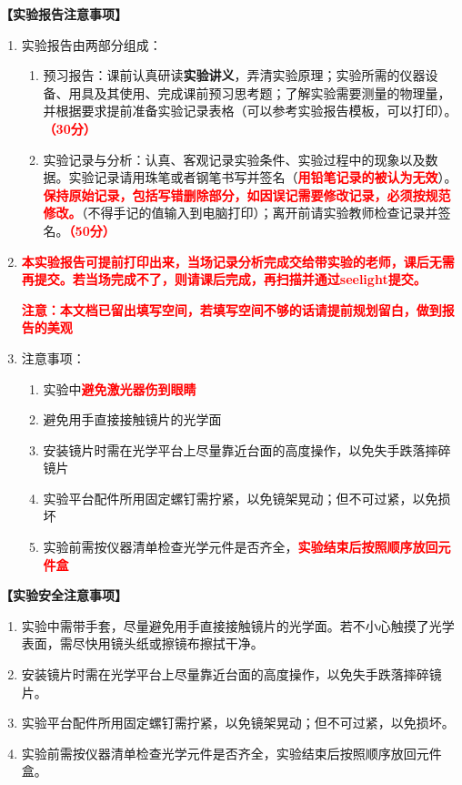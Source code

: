 \documentclass[dvipsnames, svgnames,a4paper,11pt]{article}
\begin{document}
	\textbf{【实验报告注意事项】}
	\begin{enumerate}[label=\arabic*., leftmargin=*]
		\item 实验报告由两部分组成：
		\begin{enumerate}[label=\arabic*), leftmargin=*]
			\item 预习报告：课前认真研读\textbf{实验讲义}，弄清实验原理；实验所需的仪器设备、用具及其使用、完成课前预习思考题；了解实验需要测量的物理量，并根据要求提前准备实验记录表格（可以参考实验报告模板，可以打印）。\textcolor{red}{\textbf{（30分）}}
			\item 实验记录与分析：认真、客观记录实验条件、实验过程中的现象以及数据。实验记录请用珠笔或者钢笔书写并签名（\textcolor{red}{\textbf{用铅笔记录的被认为无效}}）。\textcolor{red}{\textbf{保持原始记录，包括写错删除部分，如因误记需要修改记录，必须按规范修改。}}（不得手记的值输入到电脑打印）；离开前请实验教师检查记录并签名。\textcolor{red}{\textbf{（50分）}}
		\end{enumerate}
		
		\item \textcolor{red}{\textbf{本实验报告可提前打印出来，当场记录分析完成交给带实验的老师，课后无需再提交。若当场完成不了，则请课后完成，再扫描并通过seelight提交。}}
		
		\textcolor{red}{\textbf{注意：本文档已留出填写空间，若填写空间不够的话请提前规划留白，做到报告的美观}}
		\item 注意事项：
		\begin{enumerate}[label=\arabic*), leftmargin=*]
			\item 实验中\textcolor{red}{\textbf{避免激光器伤到眼睛}}
			\item 避免用手直接接触镜片的光学面
			\item 安装镜片时需在光学平台上尽量靠近台面的高度操作，以免失手跌落摔碎镜片
			\item 实验平台配件所用固定螺钉需拧紧，以免镜架晃动；但不可过紧，以免损坏
			\item 实验前需按仪器清单检查光学元件是否齐全，\textcolor{red}{\textbf{实验结束后按照顺序放回元件盒}}
			
		\end{enumerate}
	\end{enumerate}
	
	\textbf{【实验安全注意事项】}	
	\begin{enumerate}
		\item 实验中需带手套，尽量避免用手直接接触镜片的光学面。若不小心触摸了光学表面，需尽快用镜头纸或擦镜布擦拭干净。
		\item 安装镜片时需在光学平台上尽量靠近台面的高度操作，以免失手跌落摔碎镜片。
		\item 实验平台配件所用固定螺钉需拧紧，以免镜架晃动；但不可过紧，以免损坏。
		\item 实验前需按仪器清单检查光学元件是否齐全，实验结束后按照顺序放回元件盒。
	\end{enumerate}	
	
\end{document}
